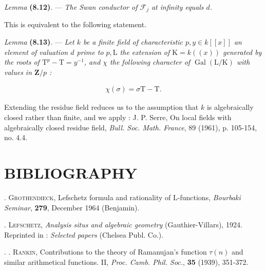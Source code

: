 \documentclass[10pt,leqno]{article}
\begin{document}
\noindent \emph{Lemma} \textbf{(8.12)}. — {\itshape The Swan conductor of \(\mathcal{F} _{j}\) at infinity equals \(d\).}\par

\noindent This is equivalent to the following statement.\par

\noindent \emph{Lemma} \textbf{(8.13)}. — {\itshape Let \(k\) be a finite field of characteristic \(p, y \in  k[[x]]\) an element of valuation \(d\) prime to \(p, \mathrm{L}\) the extension of \(\mathrm{K} = k((x))\) generated by the roots of \(\mathrm{T}^{p}-\mathrm{T} = y^{-1}\), and \(\chi \) the following character of \(\operatorname{Gal}(\mathrm{L}/\mathrm{K})\) with values in \(\mathbf{Z}/p\) :}\par

\begin{equation*}\begin{gathered}\chi (\sigma ) = \sigma \mathrm{T}-\mathrm{T}.\end{gathered}\end{equation*}

\par

\noindent Extending the residue field reduces us to the assumption that \(k\) is algebraically closed rather than finite, and we apply : J. P. Serre, On local fields with algebraically closed residue field, \emph{Bull. Soc. Math. France}, 89 (1961), p. 105-154, no. 4.4.\par

\section*{BIBLIOGRAPHY}

\noindent [\(1] \). \textsc{Grothendieck}, Lefschetz formula and rationality of \(\mathrm{L}\)-functions, \emph{Bourbaki Seminar}, \textbf{279}, December 1964 (Benjamin).\par

\noindent [\(2] \). \textsc{Lefschetz}, \emph{Analysis situs and algebraic geometry} (Gauthier-Villars), 1924. Reprinted in : \emph{Selected papers} (Chelsea Publ. Co.).\par

\noindent [\(3] . \). \textsc{Rankin}, Contributions to the theory of Ramanujan's function \(\tau (n)\) and similar arithmetical functions. II, \emph{Proc. Camb. Phil. Soc.}, \textbf{35} (1939), 351-372.\par
\end{document}
